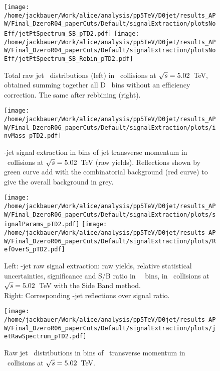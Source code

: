 \begin{figure}[bth]
\centering
	\texttt{[image: /home/jackbauer/Work/alice/analysis/pp5TeV/D0jet/results\_APW/Final\_DzeroR04\_paperCuts/Default/signalExtraction/plotsNoEff/jetPtSpectrum\_SB\_pTD2.pdf]}
	\texttt{[image: /home/jackbauer/Work/alice/analysis/pp5TeV/D0jet/results\_APW/Final\_DzeroR04\_paperCuts/Default/signalExtraction/plotsNoEff/jetPtSpectrum\_SB\_Rebin\_pTD2.pdf]}
\caption{Total raw jet \pt\ distributions (left) in \pp\ collisions at $\sqrt{s}=5.02$~TeV, obtained summing together all D \pt\ bins without an efficiency correction. The same after rebbining (right).}
\label{fig:eq_pp_signBkgJet_totR04}
\end{figure}
\begin{figure}[bth]
\centering
\texttt{[image: /home/jackbauer/Work/alice/analysis/pp5TeV/D0jet/results\_APW/Final\_DzeroR06\_paperCuts/Default/signalExtraction/plots/invMass\_pTD2.pdf]}
\caption{\Dzero-jet signal extraction in bins of jet transverse momentum in \pp\ collisions at $\sqrt{s}=5.02$~TeV (raw yields). %
Reflections shown by green curve add with the combinatorial background (red curve) to give the overall background in grey.
}
\label{fig:eq_pp_InvMass_Dzero_DbinsR06}
\end{figure}

\begin{figure}[bth]
\centering
\texttt{[image: /home/jackbauer/Work/alice/analysis/pp5TeV/D0jet/results\_APW/Final\_DzeroR06\_paperCuts/Default/signalExtraction/plots/signalParams\_pTD2.pdf]}
\texttt{[image: /home/jackbauer/Work/alice/analysis/pp5TeV/D0jet/results\_APW/Final\_DzeroR06\_paperCuts/Default/signalExtraction/plots/RefOverS\_pTD2.pdf]}
\caption{Left: \Dzero-jet raw signal extraction: raw yields, relative statistical uncertainties, significance and S/B ratio in \Dzero\ \pt\ bins, in \pp\ collisions at $\sqrt{s}=5.02$~TeV with the Side Band method.
\\Right: Corresponding \Dzero-jet reflections over signal ratio.}
\label{fig:eq_pp_RSU_raw_Dbins_DzeroR06}
\end{figure}

\begin{figure}[bth]
\centering
\texttt{[image: /home/jackbauer/Work/alice/analysis/pp5TeV/D0jet/results\_APW/Final\_DzeroR06\_paperCuts/Default/signalExtraction/plots/jetRawSpectrum\_pTD2.pdf]}
\caption{Raw jet \pt\ distributions in bins of \Dzero\ transverse momentum in \pp\ collisions at $\sqrt{s}=5.02$~TeV.}
\label{fig:eq_pp_signBkgJet_Dzero_DbinsR06}
\end{figure}

